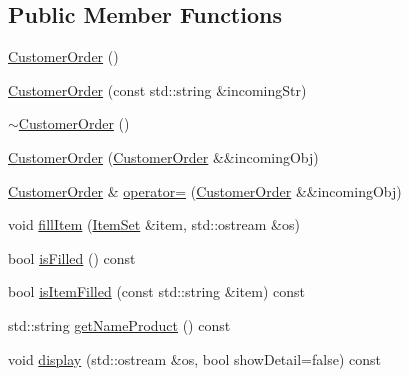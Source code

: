 \subsection*{Public Member Functions}
\begin{DoxyCompactItemize}
\item 
\mbox{\hyperlink{classsict_1_1CustomerOrder_a0cc13a97cc040386a711d131a7dbbb95}{Customer\+Order}} ()
\item 
\mbox{\hyperlink{classsict_1_1CustomerOrder_a99059f4ad8017fc50cd7415399c19590}{Customer\+Order}} (const std\+::string \&incoming\+Str)
\item 
\mbox{\hyperlink{classsict_1_1CustomerOrder_a88b510e099b274b0c49f89ca26c47579}{$\sim$\+Customer\+Order}} ()
\item 
\mbox{\hyperlink{classsict_1_1CustomerOrder_aec3ddf69effe4f1a0a3fceff70f15c68}{Customer\+Order}} (\mbox{\hyperlink{classsict_1_1CustomerOrder}{Customer\+Order}} \&\&incoming\+Obj)
\item 
\mbox{\hyperlink{classsict_1_1CustomerOrder}{Customer\+Order}} \& \mbox{\hyperlink{classsict_1_1CustomerOrder_a1502e66899c28b565610e8516985a27b}{operator=}} (\mbox{\hyperlink{classsict_1_1CustomerOrder}{Customer\+Order}} \&\&incoming\+Obj)
\item 
void \mbox{\hyperlink{classsict_1_1CustomerOrder_a08ec1a2acdd124da489e2e9177349ffb}{fill\+Item}} (\mbox{\hyperlink{classsict_1_1ItemSet}{Item\+Set}} \&item, std\+::ostream \&os)
\item 
bool \mbox{\hyperlink{classsict_1_1CustomerOrder_a70160bacde7481aaeb51d1455429199f}{is\+Filled}} () const
\item 
bool \mbox{\hyperlink{classsict_1_1CustomerOrder_a1f8f4fab0abe3139267fe75b1265f99d}{is\+Item\+Filled}} (const std\+::string \&item) const
\item 
std\+::string \mbox{\hyperlink{classsict_1_1CustomerOrder_a9476430dd30e84d937af5b433e7c6471}{get\+Name\+Product}} () const
\item 
void \mbox{\hyperlink{classsict_1_1CustomerOrder_a76b1be8cf0608e0778460f5f58657d5a}{display}} (std\+::ostream \&os, bool show\+Detail=false) const
\end{DoxyCompactItemize}
